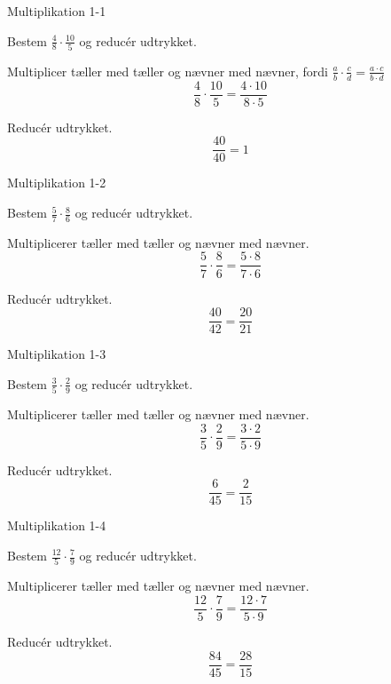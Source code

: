 \documentclass{article}
\begin{document}

\tableofcontents
\newpage

\begin{exercise}{Multiplikation 1-1}

Bestem $\frac{4}{8} \cdot \frac{10}{5}$ og reducér udtrykket.


\hint

Multiplicer tæller med tæller og nævner med nævner, fordi
$\frac{a}{b} \cdot \frac{c}{d} = \frac{a \cdot c}{b \cdot d}$
\[
\frac{4}{8} \cdot \frac{10}{5} = \frac{4 \cdot 10}{8 \cdot 5}
\]

\hint

Reducér udtrykket.
\[
\frac{40}{40} = 1
\]

\end{exercise}

\newpage

\begin{exercise}{Multiplikation 1-2}

Bestem $\frac{5}{7} \cdot \frac{8}{6}$ og reducér udtrykket.


\hint

Multiplicerer tæller med tæller og nævner med nævner.
\[
\frac{5}{7} \cdot \frac{8}{6} = \frac{5 \cdot 8}{7 \cdot 6}
\]

\hint

Reducér udtrykket.
\[
\frac{40}{42} = \frac{20}{21}
\]

\end{exercise}

\newpage

\begin{exercise}{Multiplikation 1-3}

Bestem $\frac{3}{5} \cdot \frac{2}{9}$ og reducér udtrykket.


\hint

Multiplicerer tæller med tæller og nævner med nævner.
\[
\frac{3}{5} \cdot \frac{2}{9}= \frac{3 \cdot 2}{5 \cdot 9}
\]

\hint

Reducér udtrykket.
\[
\frac{6}{45} = \frac{2}{15}
\]

\end{exercise}

\newpage

\begin{exercise}{Multiplikation 1-4}

Bestem $\frac{12}{5} \cdot \frac{7}{9}$ og reducér udtrykket.


\hint

Multiplicerer tæller med tæller og nævner med nævner.
\[
\frac{12}{5} \cdot \frac{7}{9} = \frac{12 \cdot 7}{5 \cdot 9}
\]

\hint

Reducér udtrykket.
\[
\frac{84}{45} = \frac{28}{15}
\]

\end{exercise}
\end{document}
